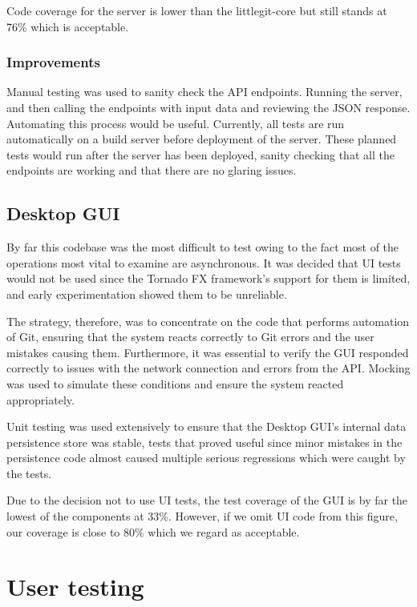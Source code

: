 Code coverage for the server is lower than the littlegit-core but still stands at 76\% which is acceptable.

\subsubsection{Improvements}

Manual testing was used to sanity check the API endpoints. Running the server, and then calling the endpoints with input data and reviewing the JSON response. Automating this process would be useful. Currently, all tests are run automatically on a build server before deployment of the server. These planned tests would run after the server has been deployed, sanity checking that all the endpoints are working and that there are no glaring issues. 
 
\subsection{Desktop GUI}

By far this codebase was the most difficult to test owing to the fact most of the operations most vital to examine are asynchronous. It was decided that UI tests would not be used since the Tornado FX framework's support for them is limited, and early experimentation showed them to be unreliable.

The strategy, therefore, was to concentrate on the code that performs automation of Git, ensuring that the system reacts correctly to Git errors and the user mistakes causing them. Furthermore, it was essential to verify the GUI responded correctly to issues with the network connection and errors from the API. Mocking was used to simulate these conditions and ensure the system reacted appropriately.

Unit testing was used extensively to ensure that the Desktop GUI's internal data persistence store was stable, tests that proved useful since minor mistakes in the persistence code almost caused multiple serious regressions which were caught by the tests.

Due to the decision not to use UI tests, the test coverage of the GUI is by far the lowest of the components at 33\%. However, if we omit UI code from this figure, our coverage is close to 80\% which we regard as acceptable.

\section{User testing}

